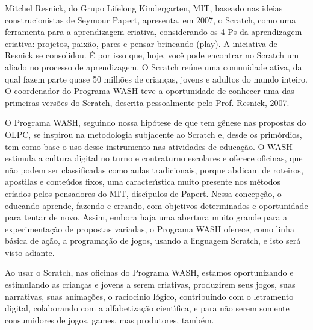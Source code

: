 \documentclass[
12pt,		%
openright,	%
twoside,  %
a4paper,			%
chapter=TITLE,		%
english,			%
french,				%
spanish,			%
brazil				%
]{USPSC-classe/USPSC}
\begin{document}
Mitchel Resnick, do Grupo Lifelong Kindergarten, MIT, baseado nas ideias construcionistas de Seymour Papert, apresenta, em 2007, o Scratch, como uma ferramenta para a aprendizagem criativa, considerando os 4 Ps da aprendizagem criativa: projetos, paix\~ao, pares e pensar brincando (play). A iniciativa de Resnick se consolidou. \'E por isso que, hoje, voc\^e pode encontrar no Scratch um aliado no processo de aprendizagem. O Scratch re\'une uma comunidade ativa, da qual fazem parte quase 50 milh\~oes de crian\c{c}as, jovens e adultos do mundo inteiro. O coordenador do Programa WASH teve a oportunidade de conhecer uma das primeiras vers\~oes do Scratch, descrita pessoalmente pelo Prof. Resnick, 2007.

















O Programa WASH, seguindo nossa hip\'otese de que tem g\^enese nas propostas do OLPC, se inspirou na metodologia subjacente ao Scratch e, desde os prim\'ordios, tem como base o uso desse instrumento nas atividades de educa\c{c}\~ao. O WASH estimula a cultura digital no turno e contraturno escolares e oferece oficinas, que n\~ao podem ser classificadas como aulas tradicionais, porque abdicam de roteiros, apostilas e conte\'udos fixos, uma caracter\'{\i}stica muito presente nos m\'etodos criados pelos pensadores do MIT, disc\'{\i}pulos de Papert. Nessa concep\c{c}\~ao, o educando aprende, fazendo e errando, com objetivos determinados e oportunidade para tentar de novo. Assim, embora haja uma abertura muito grande para a experimenta\c{c}\~ao de propostas variadas, o Programa WASH oferece, como linha b\'asica de a\c{c}\~ao, a programa\c{c}\~ao de jogos, usando a linguagem Scratch, e isto ser\'a visto adiante.

















Ao usar o Scratch, nas oficinas do Programa WASH, estamos oportunizando e estimulando \textquotedbl as crian\c{c}as e jovens a serem criativas, produzirem seus jogos, suas narrativas, suas anima\c{c}\~oes, o racioc\'{\i}nio l\'ogico, contribuindo com o letramento digital, colaborando com a alfabetiza\c{c}\~ao cient\'{\i}fica, e para n\~ao serem somente consumidores de jogos, games, mas produtores, tamb\'em\textquotedbl .
\end{document}
